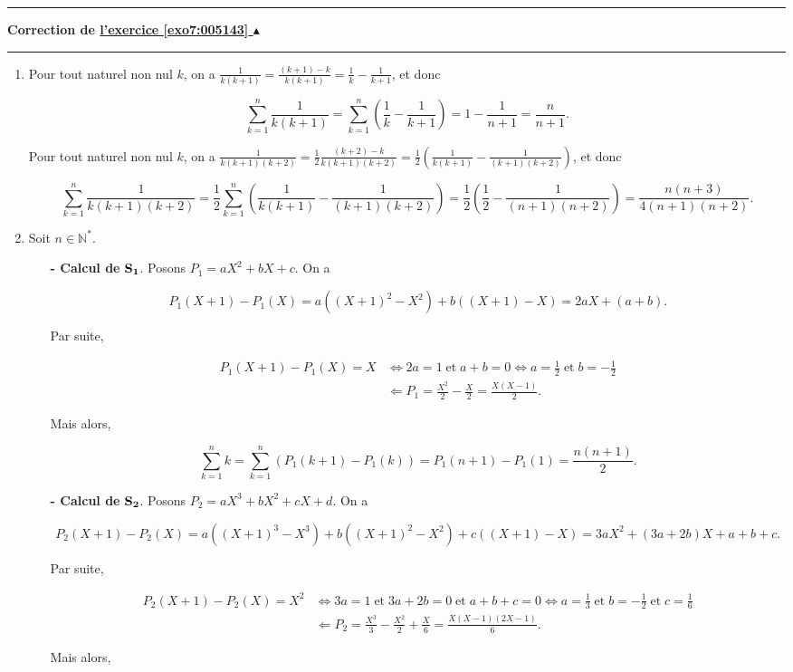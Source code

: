 \documentclass[11pt,a4paper]{article}
\newcommand{\Nn}{\mathbb{N}} \newcommand{\N}{\mathbb{N}}
\newcounter{exo}
\newcommand{\correction}[1]{\hypertarget{cor7:#1}{}\label{cor7:#1}{\bf Correction de \hyperlink{exo7:#1}{l'exercice \ref{exo7:#1} $\blacktriangle$}}\vspace{1mm}\hrule\vspace{1mm}}
\newcommand{\fincorrection}{\vspace{1mm}\hrule\vspace*{7mm}}
\begin{document}
\fincorrection
\correction{005143}
\begin{enumerate}
\item  Pour tout naturel non nul $k$, on a $\frac{1}{k(k+1)}=\frac{(k+1)-k}{k(k+1)}=\frac{1}{k}-\frac{1}{k+1}$,
et donc

$$\sum_{k=1}^{n}\frac{1}{k(k+1)}=\sum_{k=1}^{n}(\frac{1}{k}-\frac{1}{k+1})=1-\frac{1}{n+1}=\frac{n}{n+1}.$$

Pour tout naturel non nul $k$, on a
$\frac{1}{k(k+1)(k+2)}=\frac{1}{2}\frac{(k+2)-k}{k(k+1)(k+2)}=\frac{1}{2}(\frac{1}{k(k+1)}-\frac{1}{(k+1)(k+2)})$,
et donc

$$\sum_{k=1}^{n}\frac{1}{k(k+1)(k+2)}=\frac{1}{2}\sum_{k=1}^{n}(\frac{1}{k(k+1)}-\frac{1}{(k+1)(k+2)})=\frac{1}{2}(
\frac{1}{2}-\frac{1}{(n+1)(n+2)})=
\frac{n(n+3)}{4(n+1)(n+2)}.$$

\item  Soit $n\in\Nn^*$.
\begin{itemize}
\item[\textbf{- Calcul de} $\bf{S_1}$.] Posons $P_1=aX^2+bX+c$. On a

$$P_1(X+1)-P_1(X)=a((X+1)^2-X^2)+b((X+1)-X)=2aX+(a+b).$$

Par suite,

\begin{align*}
P_1(X+1)-P_1(X)=X&\Leftrightarrow 2a=1\;\mbox{et}\;a+b=0\Leftrightarrow a=\frac{1}{2}\;\mbox{et}\;b=-\frac{1}{2}\\
 &\Leftarrow
P_1=\frac{X^2}{2}-\frac{X}{2}=\frac{X(X-1)}{2}.
\end{align*}

Mais alors,

$$\sum_{k=1}^{n}k=\sum_{k=1}^{n}(P_1(k+1)-P_1(k))=P_1(n+1)-P_1(1)=\frac{n(n+1)}{2}.$$

\item[\textbf{- Calcul de} $\bf{S_2}$.] Posons $P_2=aX^3+bX^2+cX+d$. On a

$$P_2(X+1)-P_2(X)=a((X+1)^3-X^3)+b((X+1)^2-X^2)+c((X+1)-X)=3aX^2+(3a+2b)X+a+b+c.$$

Par suite,

\begin{align*}
P_2(X+1)-P_2(X)=X^2&\Leftrightarrow 3a=1\;\mbox{et}\;3a+2b=0\;\mbox{et}\;a+b+c=0\Leftrightarrow
a=\frac{1}{3}\;\mbox{et}\;b=-\frac{1}{2}\;\mbox{et}\;c=\frac{1}{6}\\
 &\Leftarrow P_2=\frac{X^3}{3}-\frac{X^2}{2}+\frac{X}{6}=\frac{X(X-1)(2X-1)}{6}.
\end{align*}

Mais alors,


\end{itemize}
\end{enumerate}
\end{document}
